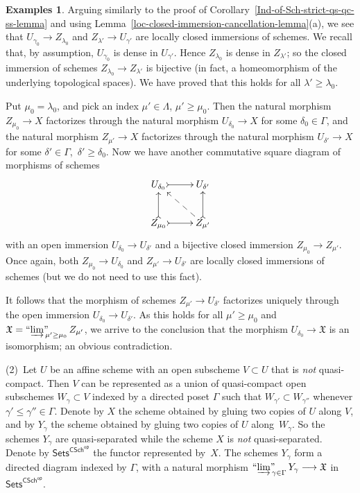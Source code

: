 \documentclass[12pt,a4paper]{amsart}
\newcommand{\+}{\protect\nobreakdash-}
\renewcommand{\:}{\colon}
\newcommand{\rarrow}{\longrightarrow}
\newcommand{\Sets}{\mathsf{Sets}}
\newcommand{\CSch}{\mathsf{CSch}}
\newcommand{\sop}{\mathsf{op}}
\newcommand{\ilim}
 {\mathop{\text{\normalfont``$\varinjlim$''\!\!}}\nolimits}
\newcommand{\fX}{\mathfrak X}
\theoremstyle{plain}
\theoremstyle{definition}
\newtheorem{exs}[thm]{Examples}
\begin{document}
\begin{exs}
 Arguing similarly to the proof of 
Corollary~\ref{Ind-of-Sch-strict-qs-qc-ss-lemma} and using
Lemma~\ref{loc-closed-immersion-cancellation-lemma}(a), we see
that $U_{\gamma_0}\rarrow Z_{\lambda_0}$ and
$Z_{\lambda'}\rarrow U_{\gamma'}$ are locally closed immersions
of schemes.
 We recall that, by assumption, $U_{\gamma_0}$ is dense in
$U_{\gamma'}$.
 Hence $Z_{\lambda_0}$ is dense in $Z_{\lambda'}$; so the closed
immersion of schemes $Z_{\lambda_0}\rarrow Z_{\lambda'}$
is bijective (in fact, a homeomorphism of the underlying
topological spaces).
 We have proved that this holds for all $\lambda'\ge\lambda_0$.

 Put $\mu_0=\lambda_0$, and pick an index $\mu'\in\Lambda$,
$\mu'\ge\mu_0$.
 Then the natural morphism $Z_{\mu_0}\rarrow X$
factorizes through the natural morphism $U_{\delta_0}\rarrow X$
for some $\delta_0\in\Gamma$, and the natural morphism
$Z_{\mu'}\rarrow X$ factorizes through the natural morphism
$U_{\delta'}\rarrow X$ for some $\delta'\in\Gamma$,
\,$\delta'\ge\delta_0$.
 Now we have another commutative square diagram of morphisms of
schemes
$$
 \xymatrix{
  U_{\delta_0} \ar@{>->}[r] & U_{\delta'} \\
  Z_{\mu_0} \ar@{>->}[r] \ar@{>->}[u]
  & Z_{\mu'} \ar@{>->}[u] \ar@{-->}[lu]
 }
$$
with an open immersion $U_{\delta_0}\rarrow U_{\delta'}$
and a bijective closed immersion $Z_{\mu_0}\rarrow Z_{\mu'}$.
 Once again, both $Z_{\mu_0}\rarrow U_{\delta_0}$ and
$Z_{\mu'}\rarrow U_{\delta'}$ are locally closed immersions
of schemes (but we do not need to use this fact).

 It follows that the morphism of schemes $Z_{\mu'}\rarrow
U_{\delta'}$ factorizes uniquely through the open immersion
$U_{\delta_0}\rarrow U_{\delta'}$.
 As this holds for all $\mu'\ge\mu_0$ and
$\fX=\ilim_{\mu'\ge\mu_0}Z_{\mu'}$, we arrive to the conclusion that
the morphism $U_{\delta_0}\rarrow\fX$ is an isomorphism; an obvious
contradiction.

\smallskip
 (2)~Let $U$ be an affine scheme with an open subscheme $V\subset U$
that is \emph{not} quasi-compact.
 Then $V$ can be represented as a union of quasi-compact open
subschemes $W_\gamma\subset V$ indexed by a directed poset $\Gamma$
such that $W_{\gamma'}\subset W_{\gamma''}$ whenever
$\gamma'\le\gamma''\in\Gamma$.
 Denote by $X$ the scheme obtained by gluing two copies of $U$
along $V$, and by $Y_\gamma$ the scheme obtained by gluing two copies
of $U$ along~$W_\gamma$.
 So the schemes $Y_\gamma$ are quasi-separated while the scheme $X$
is \emph{not} quasi-separated.
 Denote by $\Sets^{\CSch^\sop}$ the functor represented by~$X$.
 The schemes $Y_\gamma$ form a directed diagram indexed by $\Gamma$,
with a natural morphism $\ilim_{\gamma\in\Gamma}Y_\gamma\rarrow\fX$
in $\Sets^{\CSch^\sop}$.


\end{exs}
\end{document}
